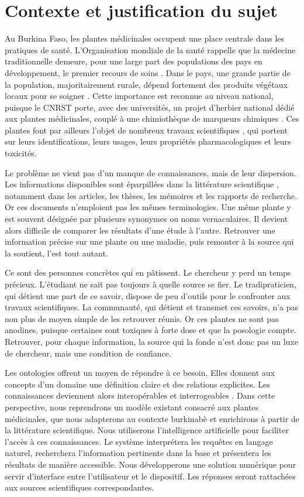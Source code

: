 \section*{Contexte et justification du sujet}
Au Burkina Faso, les plantes médicinales occupent une place centrale dans les pratiques de santé. L'Organisation mondiale de la santé rappelle que la médecine traditionnelle demeure, pour une large part des populations des pays en développement, le premier recours de soins \cite{who2013strategy}. Dans le pays, une grande partie de la population, majoritairement rurale, dépend fortement des produits végétaux locaux pour se soigner \cite{zizka_traditional_2015}. Cette importance est reconnue au niveau national, puisque le CNRST porte, avec des universités, un projet d'herbier national dédié aux plantes médicinales, couplé à une chimiothèque de marqueurs chimiques \cite{burkinaherbiermed}. Ces plantes font par ailleurs l'objet de nombreux travaux scientifiques \cite{ouedraogo_revue_2024}, qui portent sur leurs identifications, leurs usages, leurs propriétés pharmacologiques et leurs toxicités.

Le problème ne vient pas d'un manque de connaissances, mais de leur dispersion. Les informations disponibles sont éparpillées dans la littérature scientifique \cite{zizka_traditional_2015}, notamment dans les articles, les thèses, les mémoires et les rapports de recherche. Or ces documents n'emploient pas les mêmes terminologies. Une même plante y est souvent désignée par plusieurs synonymes ou noms vernaculaires. Il devient alors difficile de comparer les résultats d'une étude à l'autre. Retrouver une information précise sur une plante ou une maladie, puis remonter à la source qui la soutient, l'est tout autant.

Ce sont des personnes concrètes qui en pâtissent. Le chercheur y perd un temps précieux. L'étudiant ne sait pas toujours à quelle source se fier. Le tradipraticien, qui détient une part de ce savoir, dispose de peu d'outils pour le confronter aux travaux scientifiques. La communauté, qui détient et transmet ces savoirs, n'a pas non plus de moyen simple de les retrouver réunis. Or ces plantes ne sont pas anodines, puisque certaines sont toxiques à forte dose et que la posologie compte. Retrouver, pour chaque information, la source qui la fonde n'est donc pas un luxe de chercheur, mais une condition de confiance.

Les ontologies offrent un moyen de répondre à ce besoin. Elles donnent aux concepts d'un domaine une définition claire et des relations explicites. Les connaissances deviennent alors interopérables et interrogeables \cite{studer1998knowledge}. Dans cette perspective, nous reprendrons un modèle existant consacré aux plantes médicinales, que nous adapterons au contexte burkinabè et enrichirons à partir de la littérature scientifique. Nous utiliserons l'intelligence artificielle pour faciliter l'accès à ces connaissances. Le système interprétera les requêtes en langage naturel, recherchera l'information pertinente dans la base et présentera les résultats de manière accessible. Nous développerons une solution numérique pour servir d'interface entre l'utilisateur et le dispositif. Les réponses seront rattachées aux sources scientifiques correspondantes.

